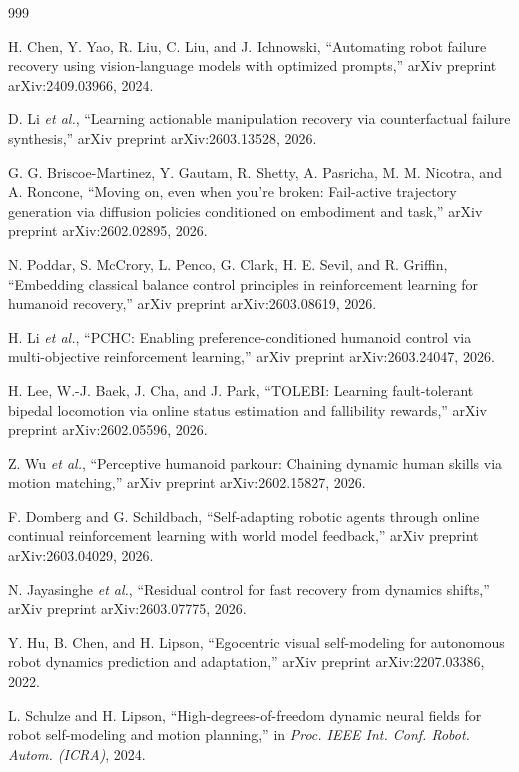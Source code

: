 ﻿\documentclass[12pt,a4paper,oneside]{report}
\begin{document}
\begin{thebibliography}{999}

H. Chen, Y. Yao, R. Liu, C. Liu, and J. Ichnowski, ``Automating robot failure recovery using vision-language models with optimized prompts,'' arXiv preprint arXiv:2409.03966, 2024.


D. Li \textit{et al.}, ``Learning actionable manipulation recovery via counterfactual failure synthesis,'' arXiv preprint arXiv:2603.13528, 2026.


G. G. Briscoe-Martinez, Y. Gautam, R. Shetty, A. Pasricha, M. M. Nicotra, and A. Roncone, ``Moving on, even when you're broken: Fail-active trajectory generation via diffusion policies conditioned on embodiment and task,'' arXiv preprint arXiv:2602.02895, 2026.


N. Poddar, S. McCrory, L. Penco, G. Clark, H. E. Sevil, and R. Griffin, ``Embedding classical balance control principles in reinforcement learning for humanoid recovery,'' arXiv preprint arXiv:2603.08619, 2026.


H. Li \textit{et al.}, ``{PCHC}: Enabling preference-conditioned humanoid control via multi-objective reinforcement learning,'' arXiv preprint arXiv:2603.24047, 2026.


H. Lee, W.-J. Baek, J. Cha, and J. Park, ``{TOLEBI}: Learning fault-tolerant bipedal locomotion via online status estimation and fallibility rewards,'' arXiv preprint arXiv:2602.05596, 2026.


Z. Wu \textit{et al.}, ``Perceptive humanoid parkour: Chaining dynamic human skills via motion matching,'' arXiv preprint arXiv:2602.15827, 2026.


F. Domberg and G. Schildbach, ``Self-adapting robotic agents through online continual reinforcement learning with world model feedback,'' arXiv preprint arXiv:2603.04029, 2026.


N. Jayasinghe \textit{et al.}, ``Residual control for fast recovery from dynamics shifts,'' arXiv preprint arXiv:2603.07775, 2026.


Y. Hu, B. Chen, and H. Lipson, ``Egocentric visual self-modeling for autonomous robot dynamics prediction and adaptation,'' arXiv preprint arXiv:2207.03386, 2022.


L. Schulze and H. Lipson, ``High-degrees-of-freedom dynamic neural fields for robot self-modeling and motion planning,'' in \textit{Proc. IEEE Int. Conf. Robot. Autom. (ICRA)}, 2024.

\end{thebibliography}
\end{document}
